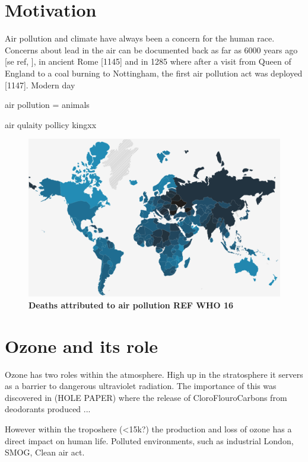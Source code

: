\section{Motivation}

Air pollution and climate have always been a concern for the human race. Concerns about lead in the air can be documented back as far as 6000 years ago [se ref, ], in ancient Rome [1145] and in 1285 where after a visit from Queen of England to a coal burning to Nottingham, the first air pollution act was deployed [1147]. Modern day




air pollution = animals

air qulaity pollicy
kingxx

\begin{figure}[H]
  \centering
  \includegraphics[width=\textwidth]{who.png}
  \caption{\textbf{Deaths attributed to air pollution REF WHO 16}}
  \label{fig:who}
\end{figure}




\section{Ozone and its role}
Ozone has two roles within the atmosphere. High up in the stratosphere it servers as a barrier to dangerous ultraviolet radiation. The importance of this was discovered in (HOLE PAPER) where the release of CloroFlouroCarbons from deodorants produced ...

However within the troposhere (<15k?) the production and loss of ozone has a direct impact on human life. Polluted environments, such as industrial London,
SMOG, Clean air act. 



